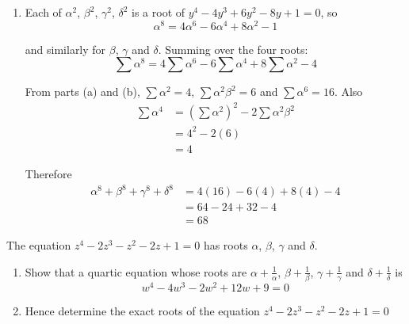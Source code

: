 \documentclass[leqno]{article}
\begin{document}
\begin{enumerate}[
  label=\textbf{\arabic*.},
  leftmargin=*,
  topsep=0pt,
  partopsep=0pt,
  parsep=0pt
]
\begin{djsSolution}
\begin{enumerate}[label=\textbf{(\alph*)}]
Using the identity for the sum of cubes of the roots:
\begin{align*}
\alpha^6+\beta^6+\gamma^6+\delta^6
&=\left(\sum\alpha^2\right)^3-3\left(\sum\alpha^2\right)\left(\sum\alpha^2\beta^2\right)+3\sum\alpha^2\beta^2\gamma^2\\
&=4^3-3(4)(6)+3(8)\\
&=64-72+24\\
&=16
\end{align*}

  \item Each of \(\alpha^2\), \(\beta^2\), \(\gamma^2\), \(\delta^2\) is a root of \(y^4-4y^3+6y^2-8y+1=0\), so
\[
\alpha^8=4\alpha^6-6\alpha^4+8\alpha^2-1
\]

and similarly for \(\beta\), \(\gamma\) and \(\delta\). Summing over the four roots:
\[
\sum\alpha^8=4\sum\alpha^6-6\sum\alpha^4+8\sum\alpha^2-4
\]

From parts (a) and (b), \(\sum\alpha^2=4\), \(\sum\alpha^2\beta^2=6\) and \(\sum\alpha^6=16\). Also
\begin{align*}
\sum\alpha^4&=\left(\sum\alpha^2\right)^2-2\sum\alpha^2\beta^2\\
&=4^2-2(6)\\
&=4
\end{align*}

Therefore
\begin{align*}
\alpha^8+\beta^8+\gamma^8+\delta^8&=4(16)-6(4)+8(4)-4\\
&=64-24+32-4\\
&=68
\end{align*}
\end{enumerate}
\end{djsSolution}


\newpage

\questionitem

The equation $z^4-2z^3-z^2-2z+1=0$ has roots $\alpha$, $\beta$, $\gamma$ and $\delta$. \\

\begin{enumerate}[label=\textbf{(\alph*)}]
  \item Show that a quartic equation whose roots are $\alpha+\frac{1}{\alpha}$, $\beta+\frac{1}{\beta}$, $\gamma+\frac{1}{\gamma}$ and $\delta+\frac{1}{\delta}$ is
  \[
  w^4-4w^3-2w^2+12w+9=0
  \]
  \item Hence determine the exact roots of the equation $z^4-2z^3-z^2-2z+1=0$  \\
\end{enumerate}


\end{enumerate}
\end{document}
